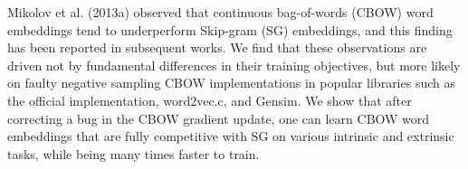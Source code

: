 Mikolov et al. (2013a) observed that continuous bag-of-words (CBOW) word embeddings tend to underperform Skip-gram (SG) embeddings, and this finding has been reported in subsequent works. We find that these observations are driven not by fundamental differences in their training objectives, but more likely on faulty negative sampling CBOW implementations in popular libraries such as the official implementation, word2vec.c, and Gensim. We show that after correcting a bug in the CBOW gradient update, one can learn CBOW word embeddings that are fully competitive with SG on various intrinsic and extrinsic tasks, while being many times faster to train.
